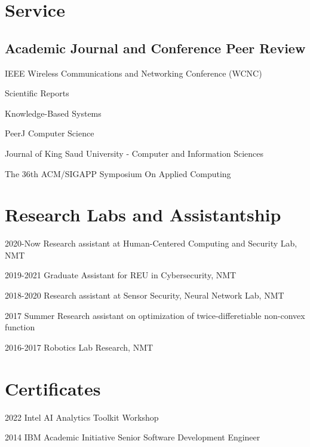 \documentclass[12pt,letterpaper]{report}
\newcommand{\listitemspace}{0.25em}
\renewenvironment{itemize}
{\begin{list}{}{\setlength{\leftmargin}{0em}
                \setlength{\parskip}{0em}
                \setlength{\itemsep}{\listitemspace}
                \setlength{\parsep}{\listitemspace}}}
{\end{list}}
\begin{document}
    \section*{Service}
    \subsection*{Academic Journal and Conference Peer Review}
    \begin{itemize}
        \item IEEE Wireless Communications and Networking Conference (WCNC)
        \item Scientific Reports
        \item Knowledge-Based Systems
        \item PeerJ Computer Science
        \item Journal of King Saud University - Computer and Information Sciences 
        \item The 36th ACM/SIGAPP Symposium On Applied Computing
    \end{itemize}

    \section*{Research Labs and Assistantship}
    \begin{tablist}
        \item[2020-Now] \tab{}Research assistant at Human-Centered Computing and Security Lab, NMT
        \item[2019-2021] \tab{}Graduate Assistant for REU in Cybersecurity, NMT
        \item[2018-2020] \tab{}Research assistant at Sensor Security, Neural Network Lab, NMT
        \item[2017 Summer] \tab{}Research assistant on optimization of twice-differetiable non-convex function
        \item[2016-2017] \tab{}Robotics Lab Research, NMT
    \end{tablist}

    \section*{Certificates}
    \begin{tablist}
        \item[2022] \tab{}Intel AI Analytics Toolkit Workshop
        \item[2014] \tab{}IBM Academic Initiative Senior Software Development Engineer
    \end{tablist}
\end{document}
